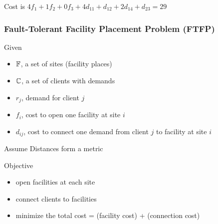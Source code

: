 \documentclass[handout, hyperref, xcolor=dvipsnames]{beamer}
\begin{document}
\begin{frame}
\begin{minipage}{.4\linewidth}
  \end{minipage}
  \vspace{.1in}

  Cost is $4f_1 + 1f_2 + 0f_3 + 4d_{11} + d_{12} + 2d_{14} +
  d_{23} = 29$
\end{frame}
\begin{frame}
  \frametitle{Fault-Tolerant Facility Placement Problem (FTFP)}
  Given
  \begin{itemize}
  \item $\mathbb{F}$, a set of sites (facility places)
  \item $\mathbb{C}$, a set of clients with demands
  \item $r_j$, demand for client $j$
  \item $f_i$, cost to open one facility at site $i$
  \item $d_{ij}$, cost to connect one demand from client $j$ to
    facility at site $i$
  \end{itemize}
  Assume Distances form a metric

  Objective
  \begin{itemize}
  \item open facilities at each site
  \item connect clients to facilities
  \item minimize the total cost = (facility cost) + (connection cost)
  \end{itemize}

\end{frame}
\end{document}
